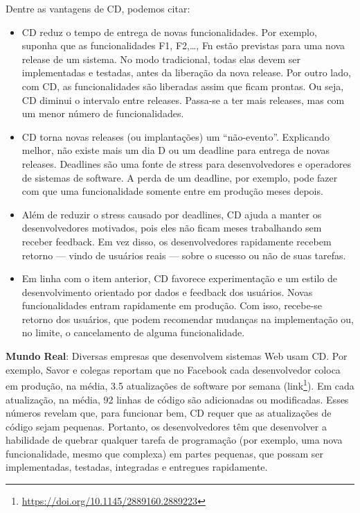 \documentclass[
  11pt,
  twoside]{book}
\DeclareRobustCommand{\href}[2]{#2\footnote{\url{#1}}}
\newenvironment{esmbox}{\centering \vspace{1.5ex} \begin{tcolorbox}[breakable, colback=backcolor, width=4.9in]}{\end{tcolorbox} \vspace{1.5ex}}
\begin{document}
Dentre as vantagens de CD, podemos citar:

\begin{itemize}
\item
  CD reduz o tempo de entrega de novas funcionalidades. Por exemplo,
  suponha que as funcionalidades F1, F2,\ldots, Fn estão previstas para
  uma nova release de um sistema. No modo tradicional, todas elas devem
  ser implementadas e testadas, antes da liberação da nova release. Por
  outro lado, com CD, as funcionalidades são liberadas assim que ficam
  prontas. Ou seja, CD diminui o intervalo entre releases. Passa-se a
  ter mais releases, mas com um menor número de funcionalidades.
\item
  CD torna novas releases (ou implantações) um ``não-evento''.
  Explicando melhor, não existe mais um dia D ou um deadline para
  entrega de novas releases. Deadlines são uma fonte de stress para
  desenvolvedores e operadores de sistemas de software. A perda de um
  deadline, por exemplo, pode fazer com que uma funcionalidade somente
  entre em produção meses depois.
\item
  Além de reduzir o stress causado por deadlines, CD ajuda a manter os
  desenvolvedores motivados, pois eles não ficam meses trabalhando sem
  receber feedback. Em vez disso, os desenvolvedores rapidamente recebem
  retorno --- vindo de usuários reais --- sobre o sucesso ou não de suas
  tarefas.
\item
  Em linha com o item anterior, CD favorece experimentação e um estilo
  de desenvolvimento orientado por dados e feedback dos usuários. Novas
  funcionalidades entram rapidamente em produção. Com isso, recebe-se
  retorno dos usuários, que podem recomendar mudanças na implementação
  ou, no limite, o cancelamento de alguma funcionalidade.
\end{itemize}


\begin{esmbox}

\textbf{Mundo Real}: Diversas empresas que desenvolvem sistemas Web usam
CD. Por exemplo, Savor e colegas reportam que no Facebook cada
desenvolvedor coloca em produção, na média, 3.5 atualizações de software
por semana (\href{https://doi.org/10.1145/2889160.2889223}{link}). Em
cada atualização, na média, 92 linhas de código são adicionadas ou
modificadas. Esses números revelam que, para funcionar bem, CD requer
que as atualizações de código sejam pequenas. Portanto, os
desenvolvedores têm que desenvolver a habilidade de quebrar qualquer
tarefa de programação (por exemplo, uma nova funcionalidade, mesmo que
complexa) em partes pequenas, que possam ser implementadas, testadas,
integradas e entregues rapidamente.

\end{esmbox}
\end{document}

